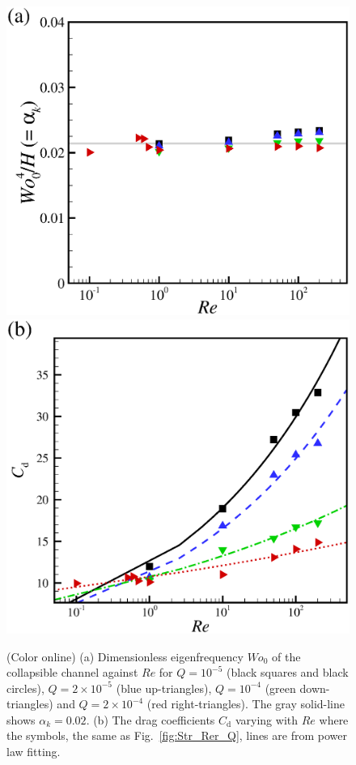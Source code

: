 \documentclass[aps,prl,reprint,superscriptaddress,floatfix]{revtex4-1}
\newcommand{\Rey}{\mathit{Re}}
\newcommand{\Wo}{\mathit{Wo}}
\begin{document}
\begin{figure}
	\centering
	\includegraphics[width=0.49\linewidth, trim={0.25cm 0cm 1.5cm 1.5cm}, clip]{./epsFig/fig4a.eps}
	\includegraphics[width=0.49\linewidth, trim={0.25cm 0cm 1.5cm 1.5cm}, clip]{./epsFig/fig4b.eps}
	\caption{\label{fig:Wo0}(Color online) (a) Dimensionless eigenfrequency $\Wo_0$ of the collapsible channel against $\Rey$ for $Q=10^{-5}$ (black squares and black circles), $Q=2 \times 10^{-5}$ (blue up-triangles), $Q=10^{-4}$ (green down-triangles) and $Q=2\times10^{-4}$ (red right-triangles). The gray solid-line shows $\alpha_k=0.02$.	 
	(b) The drag coefficients $C_\text{d}$ varying with $Re$ where the symbols, the same as Fig.~\ref{fig:Str_Rer_Q}, lines are from power law fitting.
	}
\end{figure}
\end{document}
